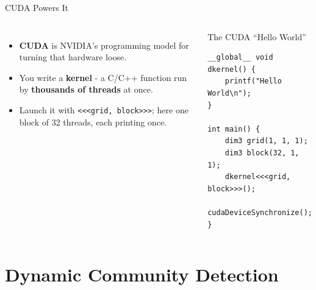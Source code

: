 \documentclass[aspectratio=169]{beamer}
\begin{document}
\begin{frame}[fragile]{CUDA Powers It}
    \begin{columns}
        \begin{itemize}
            \item \textbf{CUDA} is NVIDIA's programming model for turning that hardware loose.
            \item You write a \textbf{kernel} - a C/C++ function run by \textbf{thousands of
            threads} at once.
            \item Launch it with \texttt{<<<grid, block>>>}; here one block of 32 threads, each
            printing once.
        \end{itemize}
        \begin{exampleblock}{The CUDA ``Hello World''}
{\scriptsize
\begin{verbatim}
__global__ void dkernel() {
    printf("Hello World\n");
}

int main() {
    dim3 grid(1, 1, 1);
    dim3 block(32, 1, 1);
    dkernel<<<grid, block>>>();
    cudaDeviceSynchronize();
}
\end{verbatim}
}
        \end{exampleblock}
    \end{columns}
\end{frame}

\section{Dynamic Community Detection}
\end{document}
